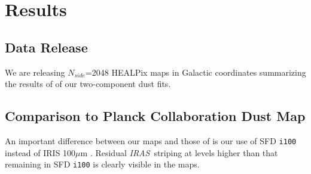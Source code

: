 \documentclass{emulateapj}
\newcommand{\IRAS}{{\it IRAS}}
\begin{document}




\section{Results}
\label{sec:results}

\subsection{Data Release}
We are releasing $N_{side}$=2048 HEALPix maps in Galactic coordinates 
summarizing the results of of our two-component dust fits.




\subsection{Comparison to Planck Collaboration Dust Map}
An important difference between our maps and those of \cite{planckdust} is our 
use of SFD \verb|i100| instead of IRIS 100$\mu$m \citep{IRIS}. Residual 
\IRAS~striping at levels higher than that remaining in SFD \verb|i100| is 
clearly visible in the \cite{planckdust} maps.
\end{document}
